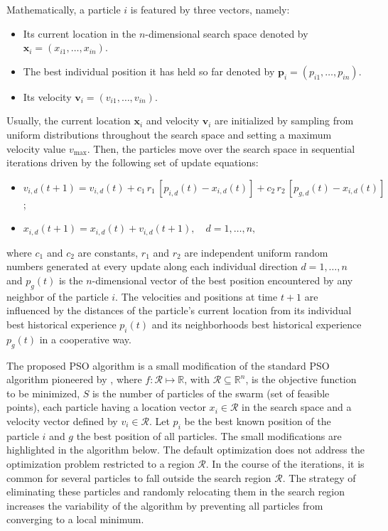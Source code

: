 \documentclass[10pt,letterpaper]{article}
\begin{document}
Mathematically, a particle $i$ is featured by three vectors, namely:
\begin{itemize}
\item Its current location in the $n$-dimensional search space denoted by $\boldsymbol{x}_i = (x_{i1}, \ldots, x_{in})$.
\item The best individual position it has held so far denoted by $\boldsymbol{p}_i = (p_{i1}, \ldots, p_{in})$.
\item Its velocity $\boldsymbol{v}_i = (v_{i1}, \ldots, v_{in})$.
\end{itemize}
Usually, the current location $\boldsymbol{x}_i$ and velocity $\boldsymbol{v}_i $ are initialized by sampling from uniform distributions throughout the
search space and setting a maximum velocity value $v_{\mathrm{max}}$. Then, the particles move over the search space in sequential iterations
driven by the following set of update equations:
\begin{itemize}
\item $v_{i,d}(t+1) = v_{i,d}(t) + c_1\, r_1\, [p_{i,d}(t) - x_{i,d}(t)] + c_2\, r_2\, [p_{g,d}(t) - x_{i,d}(t)]$;
\item $x_{i,d}(t+1) = x_{i,d}(t) + v_{i,d}(t+1), \quad d = 1, \ldots, n,$
\end{itemize}
where $c_1$ and $c_2$ are constants, $r_1$ and $r_2$ are independent uniform random numbers generated at every update along each individual direction $d = 1, \ldots, n$ and $p_g(t)$ is the $n$-dimensional vector of the best position encountered by any neighbor of the particle $i$. The velocities and positions
at time $t+1$ are influenced by the distances of the particle's current location from its individual best historical experience $p_i(t)$ and its neighborhoods best historical experience $p_g(t)$ in a cooperative way.

The proposed PSO algorithm is a small modification of the standard PSO algorithm pioneered by \cite{kennedyeberhart1995}, where $f: \mathcal{R} \mapsto \mathbb{R}$, with $\mathcal{R} \subseteq \mathbb{R}^n$, is the objective function to be minimized, $S$ is the number of particles of the swarm (set of feasible points), each particle having a location vector $x_i \in \mathcal{R}$ in the search space and a velocity vector defined by $v_i \in \mathcal{R}$. Let $p_i$ be the best known position of the particle $i$ and $g$ the best position of all particles. The small modifications are highlighted in the algorithm below. The default optimization does not address the optimization problem restricted to a region $\mathcal{R}$. In the course of the iterations, it is common for several particles to fall outside the search region $\mathcal{R}$. The strategy of eliminating these particles and randomly relocating them in the search region increases the variability of the algorithm by preventing all particles from converging to a local minimum.\\
\end{document}

